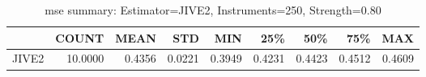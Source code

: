 \begin{table}[ht]
\centering
\caption{mse summary: Estimator=JIVE2, Instruments=250, Strength=0.80}
\begin{tabular}{lrrrrrrrr}
\toprule
 & COUNT & MEAN & STD & MIN & 25\% & 50\% & 75\% & MAX \\
\midrule
JIVE2 & 10.0000 & 0.4356 & 0.0221 & 0.3949 & 0.4231 & 0.4423 & 0.4512 & 0.4609 \\
\bottomrule
\end{tabular}
\end{table}
